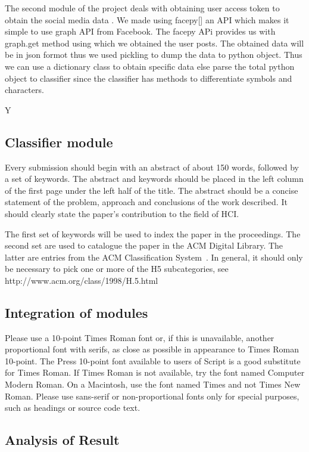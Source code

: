 \documentclass{chi2009}
\begin{document}
\begin{Abstract}
The second module of the project deals with obtaining user access token to obtain the social media data . We made using facepy[] an API which makes it simple to use graph API from Facebook. The facepy APi provides us with graph.get method using which we obtained the user posts. The obtained data will be in json formot thus we used pickling to dump the data to python object. Thus we can use a dictionary class to obtain specific data else parse the total python object to classifier since the classifier has methods to differentiate symbols and characters.  


Y

\subsection{Classifier module}

Every submission should begin with an abstract of about 150 words,
followed by a set of keywords. The abstract and keywords should be
placed in the left column of the first page under the left half of the
title. The abstract should be a concise statement of the problem,
approach and conclusions of the work described.  It should clearly
state the paper's contribution to the field of HCI.

The first set of keywords will be used to index the paper in the
proceedings. The second set are used to catalogue the paper in the ACM
Digital Library. The latter are entries from the ACM Classification
System~\cite{acm_categories}.  In general, it should only be necessary
to pick one or more of the H5 subcategories, see
http://www.acm.org/class/1998/H.5.html

\subsection{Integration of modules}

Please use a 10-point Times Roman font or, if this is unavailable,
another proportional font with serifs, as close as possible in
appearance to Times Roman 10-point. The Press 10-point font available
to users of Script is a good substitute for Times Roman. If Times
Roman is not available, try the font named Computer Modern Roman. On a
Macintosh, use the font named Times and not Times New Roman. Please
use sans-serif or non-proportional fonts only for special purposes,
such as headings or source code text.

\subsection{Analysis of Result}


\end{Abstract}
\end{document}

